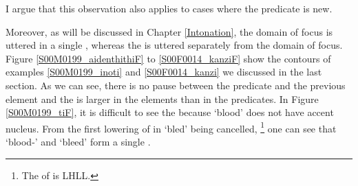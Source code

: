I argue that this observation also applies to cases where the predicate is new.

Moreover,
as will be discussed in Chapter \ref{Intonation},
the domain of focus is uttered in a single ,
whereas the  is uttered separately from the domain of focus.
Figure \ref{S00M0199_aidenthithiF} to \ref{S00F0014_kanziF} show
the  contours of examples \ref{S00M0199_inoti} and \ref{S00F0014_kanzi} we discussed in the last section.
As we can see,
there is no pause between the predicate and the previous element and
the  is larger in the elements than in the predicates.
In Figure \ref{S00M0199_tiF},
it is difficult to see the  because  `blood' does not have accent nucleus.
From the first lowering of  in  `bled' being cancelled,%
	\footnote{
	The  of  is LHLL.
	}
one can see that
 `blood-' and  `bleed' form a single .


